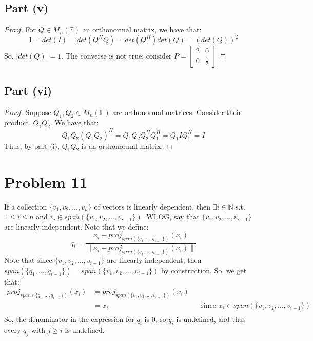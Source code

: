 \documentclass{article}
\begin{document}
\subsection*{Part (v)}

\begin{proof}
For $Q \in M_n(\mathbb{F})$ an orthonormal matrix, we have that:
$$1 = det(I) = det(Q^{H}Q) = det(Q^{H})det(Q) = (det(Q))^2$$
So, $\mid det(Q) \mid = 1$.  The converse is not true; consider $P = \begin{bmatrix} 2 & 0 \\ 0 & \frac{1}{2} \end{bmatrix}$
\end{proof}

\subsection*{Part (vi)}

\begin{proof}
Suppose $Q_1, Q_2 \in M_n(\mathbb{F})$ are orthonormal matrices. Consider their product, $Q_{1}Q_{2}$. We have that:
$$Q_{1}Q_{2}(Q_{1}Q_{2})^H = Q_{1}Q_{2}Q_{2}^{H}Q_{1}^{H} = Q_{1}IQ_{1}^{H} = I$$
Thus, by part (i), $Q_{1}Q_{2}$ is an orthonormal matrix.
\end{proof}

\section*{Problem 11}
If a collection $\{v_1, v_2, \dots, v_n\}$ of vectors is linearly dependent, then $\exists i \in \mathbb{N}$ s.t. $1 \leq i \leq n$ and $v_i \in span(\{v_1, v_2, \dots, v_{i - 1}\})$. WLOG, say that $\{v_1, v_2, \dots, v_{i - 1}\}$ are linearly independent. Note that we define:
$$q_i = \frac{x_i - proj_{span(\{q_1, \dots, q_{i - 1}\})}(x_i)}{\|x_i - proj_{span(\{q_1, \dots, q_{i - 1}\})}(x_i)\|}$$
Note that since $\{v_1, v_2, \dots, v_{i - 1}\}$ are linearly independent, then $span(\{q_1, \dots, q_{i - 1}\}) =  span(\{v_1, v_2, \dots, v_{i - 1}\})$ by construction. So, we get that:
\begin{align*}
proj_{span(\{q_1, \dots, q_{i - 1}\})}(x_i) &= proj_{span(\{v_1, v_2, \dots, v_{i - 1}\})}(x_i) \\
&= x_i &&\text{since $x_i \in span(\{v_1, v_2, \dots, v_{i - 1}\})$} \\
\end{align*}
So, the denominator in the expression for $q_i$ is 0, so $q_i$ is undefined, and thus every $q_j$ with $j \geq i$ is undefined.
\end{document}
